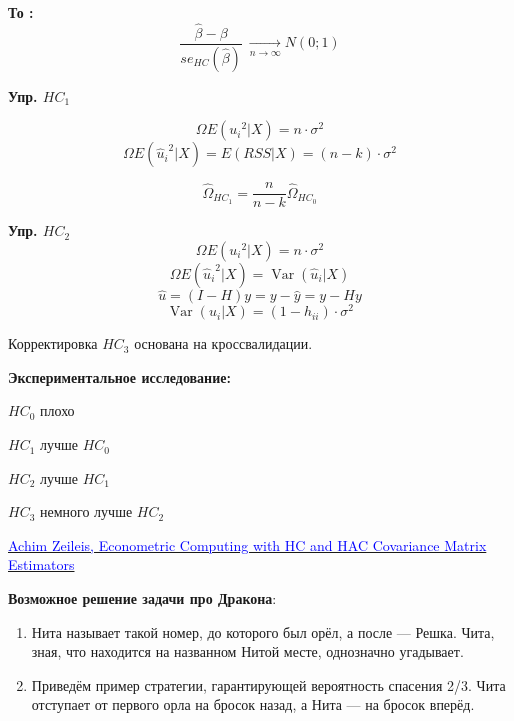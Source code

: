 \documentclass[12pt]{article} %
\theoremstyle{definition} %
\DeclareMathOperator{\Var}{Var}
\begin{document}
\textbf{То :}
\[ \frac{ \hat{\beta} - \beta }{se_{HC}(\hat{\beta})}  \:\xrightarrow[n\longrightarrow \infty]\: N(0;1)\]

\textbf{Упр. $HC_1$}

\[ \Omega E(  {u_i}^2     | X        )  = n \cdot {\sigma}^2\]
\[ \Omega E(  {{\hat{u}}_i}^2     | X        )  = E(RSS|X) = (n-k) \cdot  {\sigma}^2\]

 \[{\hat{\Omega}}_{HC_1} = \frac{n} {n-k} {\hat{\Omega}}_{HC_0}  \]


\textbf{Упр. $HC_2$} 
\[ \Omega E(  {u_i}^2     | X        )  = n \cdot {\sigma}^2\]
\[ \Omega E(  {{\hat{u}}_i}^2     | X        )  =  \Var( {\hat{u}_i}|X) \]
\[\hat{u} = (I-H)y = y - \hat{y} = y-Hy\]
\[\Var(u_i |X) = (1 - h_{ii}) \cdot {\sigma}^2\]


Корректировка $HC_3$ основана на кроссвалидации.


\textbf{Экспериментальное исследование: }
\par
$HC_0$ плохо
\par
$HC_1$ лучше $HC_0$
\par
$HC_2$ лучше $HC_1$
\par
$HC_3$ немного лучше $HC_2$
\par

\begin{thebibliography}{99}

\href{https://cran.r-project.org/web/packages/sandwich/vignettes/sandwich.pdf} {\textcolor{blue}{Achim Zeileis,
Econometric Computing with HC and HAC 
Covariance Matrix Estimators}}

\end{thebibliography}
\par\textbf{Возможное решение задачи про Дракона}:
\begin{enumerate} 
\item{Нита называет такой номер, до которого был орёл, а после —
Решка. Чита, зная, что находится на названном Нитой месте,
однозначно угадывает.}
\item{Приведём пример стратегии, гарантирующей вероятность спасения 2/3. Чита отступает от первого орла на бросок назад, а Нита — на бросок вперёд.}
\end{enumerate}
\end{document}
